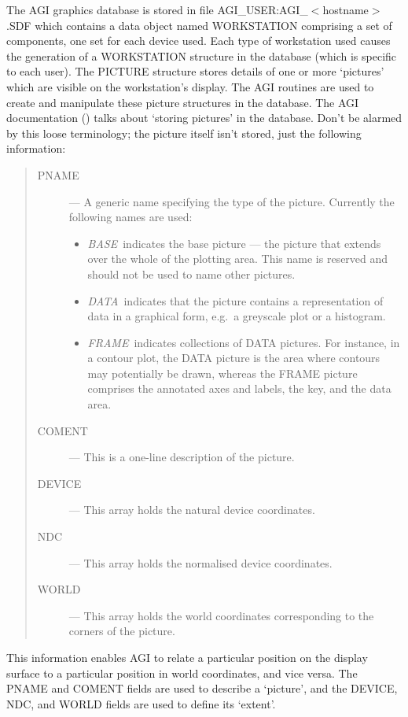 The AGI graphics database is stored in file AGI\_USER:AGI\_$<$hostname$>$.SDF
which contains a data object named WORKSTATION comprising a set of components,
one set for each device used.
Each type of workstation used causes the generation of a WORKSTATION structure
in the database (which is specific to each user).
The PICTURE structure stores details of one or more `pictures' which are
visible on the workstation's display.
The AGI routines are used to create and manipulate these picture structures in
the database.
The AGI documentation () talks about `storing pictures'
in the database.
Don't be alarmed by this loose terminology; the picture itself isn't stored,
just the following information:
\begin{quote}
\begin{description}
\item [PNAME] ---
A generic name specifying the type of the picture.
Currently the following names are used:
\begin{itemize}
\item {\em BASE}\, indicates the base picture --- the picture that extends
 over the  whole of  the plotting area.
 This name is reserved and should not be used to name other pictures.
\item {\em DATA}\, indicates that the picture contains a representation of
 data in a graphical form, e.g.\ a greyscale plot or a histogram.
\item {\em FRAME}\, indicates collections of DATA pictures.
 For instance, in a contour plot, the DATA picture is the area where contours
 may  potentially be drawn, whereas the FRAME picture comprises the annotated
 axes and labels, the key, and the data area.
\end{itemize}
\item [COMENT] ---
 This is a one-line description of the picture.
\item [DEVICE] ---
 This array holds the natural device coordinates.
\item [NDC] ---
 This array holds the normalised device coordinates.
\item [WORLD] ---
 This array holds the world coordinates corresponding to the corners of the
 picture.
\end{description}
\end{quote}
This information enables AGI to relate a particular position on the display
surface to a particular position in world coordinates, and vice versa.
The PNAME and COMENT fields are used to describe a `picture', and the DEVICE,
NDC, and WORLD fields are used to define its `extent'.

